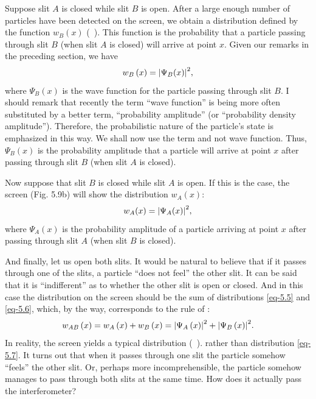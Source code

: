 Suppose slit $A$ is closed while slit $B$ is open. After a large enough
number of particles have been detected on the screen, we obtain
a distribution defined by the function $w_{B} (x)$ (~). This function is the probability that a particle passing through slit $B$ (when slit $A$ is closed) will arrive at point $x$. Given our remarks in the preceding section, we have
\begin{equation}%
w_{B} \, (x) = \abs{\Psi_{B} (x)}^{2},
\label{eq-5.5}
\end{equation}
where $\Psi_{B}(x)$ is the wave function for the particle passing through slit $B$. I should remark that recently the term ``wave function'' is being more
often substituted by a better term, ``probability amplitude'' (or ``probability density amplitude''). Therefore, the probabilistic nature of
the particle's state is emphasized in this way. We shall now use the term
 and not wave function. Thus,  $\Psi_{B}(x)$ is the probability amplitude that a particle will arrive at point $x$ after passing
through slit $B$ (when slit $A$ is closed).

Now suppose that slit $B$ is closed while slit $A$ is open. If this is the case, the screen (Fig. 5.9b) will show the distribution $w_{A} (x)$:
\begin{equation}%
w_{A} (x) = \abs{\Psi_{A}  (x)}^{2},
\label{eq-5.6}
\end{equation}
where $\Psi_{A}(x)$ is the probability amplitude of a particle arriving at point
$x$ after passing through slit $A$ (when slit $B$ is closed).

And finally, let us open both slits. It would be natural to believe that
if it passes through one of the slits, a particle ``does not feel'' the other
slit. It can be said that it is ``indifferent'' as to whether the other slit is
open or closed. And in this case the distribution on the screen should be
the sum of distributions \eqref{eq-5.5} and \eqref{eq-5.6}, which, by the way, corresponds to the rule of : 
\begin{equation}%
w_{AB} \, (x) = w_{A} \, (x) + w_{B} \, (x) =  \abs{\Psi_{A} \, (x)}^{2} +  \abs{\Psi_{B} \, (x)}^{2}.
\label{eq-5.7}
\end{equation}
In reality, the screen yields a typical  distribution
 (~).  rather than distribution \eqref{eq-5.7}. It turns out that when it passes through one slit the particle somehow ``feels'' the other slit. Or, perhaps more incomprehensible, the particle somehow manages to pass through both slits at the same time. How does it actually pass the
interferometer?

